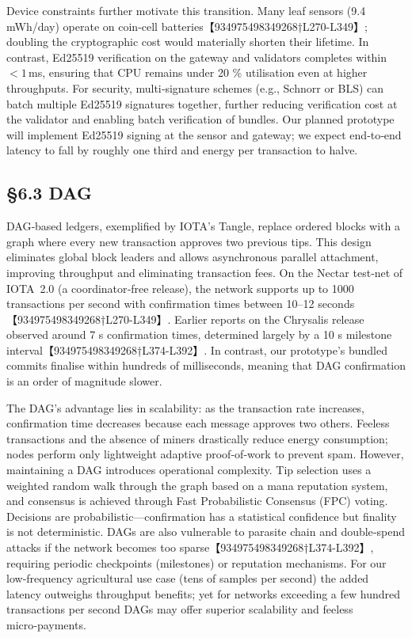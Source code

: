\documentclass[12pt,onecolumn]{IEEEtran} %
\begin{document}
Device constraints further motivate this transition.  Many leaf sensors (9.4 mWh/day) operate on coin‑cell batteries【934975498349268†L270-L349】; doubling the cryptographic cost would materially shorten their lifetime.  In contrast, Ed25519 verification on the gateway and validators completes within \(<\!1\,\)ms, ensuring that CPU remains under 20 \% utilisation even at higher throughputs.  For security, multi‑signature schemes (e.g., Schnorr or BLS) can batch multiple Ed25519 signatures together, further reducing verification cost at the validator and enabling batch verification of bundles.  Our planned prototype will implement Ed25519 signing at the sensor and gateway; we expect end‑to‑end latency to fall by roughly one third and energy per transaction to halve.

\subsection{\S6.3 DAG}
\label{subsec:dag-discussion}

DAG‑based ledgers, exemplified by IOTA’s Tangle, replace ordered blocks with a graph where every new transaction approves two previous tips.  This design eliminates global block leaders and allows asynchronous parallel attachment, improving throughput and eliminating transaction fees.  On the Nectar test‑net of IOTA~2.0 (a coordinator‑free release), the network supports up to 1000 transactions per second with confirmation times between 10–12 seconds【934975498349268†L270-L349】.  Earlier reports on the Chrysalis release observed around 7 s confirmation times, determined largely by a 10 s milestone interval【934975498349268†L374-L392】.  In contrast, our prototype’s bundled commits finalise within hundreds of milliseconds, meaning that DAG confirmation is an order of magnitude slower.

The DAG’s advantage lies in scalability: as the transaction rate increases, confirmation time decreases because each message approves two others.  Feeless transactions and the absence of miners drastically reduce energy consumption; nodes perform only lightweight adaptive proof‑of‑work to prevent spam.  However, maintaining a DAG introduces operational complexity.  Tip selection uses a weighted random walk through the graph based on a mana reputation system, and consensus is achieved through Fast Probabilistic Consensus (FPC) voting.  Decisions are probabilistic—confirmation has a statistical confidence but finality is not deterministic.  DAGs are also vulnerable to parasite chain and double‑spend attacks if the network becomes too sparse【934975498349268†L374-L392】, requiring periodic checkpoints (milestones) or reputation mechanisms.  For our low‑frequency agricultural use case (tens of samples per second) the added latency outweighs throughput benefits; yet for networks exceeding a few hundred transactions per second DAGs may offer superior scalability and feeless micro‑payments.
\end{document}
